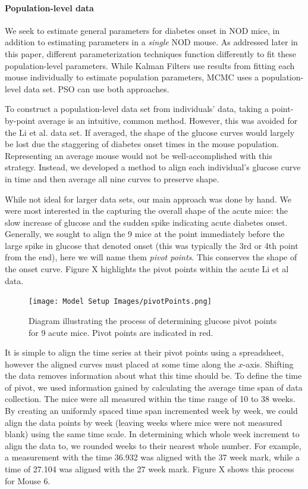 \documentclass{article}
\begin{document}
\paragraph{Population-level data} \label{section:population_level_data}
We seek to estimate general parameters for diabetes onset in NOD mice, in addition to estimating parameters in a \emph{single} NOD mouse. As addressed later in this paper, different parameterization techniques function differently to fit these population-level parameters. While Kalman Filters use results from fitting each mouse individually to estimate population parameters, MCMC uses a population-level data set. PSO can use both approaches.
\par To construct a population-level data set from individuals' data, taking a point-by-point average is an intuitive, common method. However, this was avoided for the Li et al. data set. If averaged, the shape of the glucose curves would largely be lost due the staggering of diabetes onset times in the mouse population. Representing an average mouse would not be well-accomplished with this strategy. Instead, we developed a method to align each individual's glucose curve in time and then average all nine curves to preserve shape. 
\par While not ideal for larger data sets, our main approach was done by hand. We were most interested in the capturing the overall shape of the acute mice: the slow increase of glucose and the sudden spike indicating acute diabetes onset. Generally, we sought to align the 9 mice at the point immediately before the large spike in glucose that denoted onset (this was typically the 3rd or 4th point from the end), here we will name them \emph{pivot points}. This conserves the shape of the onset curve. Figure X highlights the pivot points within the acute Li et al data.
\begin{figure}[H]
    \centering
    \texttt{[image: Model Setup Images/pivotPoints.png]}
    \caption{Diagram illustrating the process of determining glucose pivot points for 9 acute mice. Pivot points are indicated in red.}
\end{figure}
\par It is simple to align the time series at their pivot points using a spreadsheet, however the aligned curves must placed at some time along the $x$-axis. Shifting the data removes information about what this time should be. To define the time of pivot, we used information gained by calculating the average time span of data collection. The mice were all measured within the time range of 10 to 38 weeks. By creating an uniformly spaced time span incremented week by week, we could align the data points by week (leaving weeks where mice were not measured blank) using the same time scale. In determining which whole week increment to align the data to, we rounded weeks to their nearest whole number. For example, a measurement with the time 36.932 was aligned with the 37 week mark, while a time of 27.104 was aligned with the 27 week mark. Figure X shows this process for Mouse 6.
\end{document}

